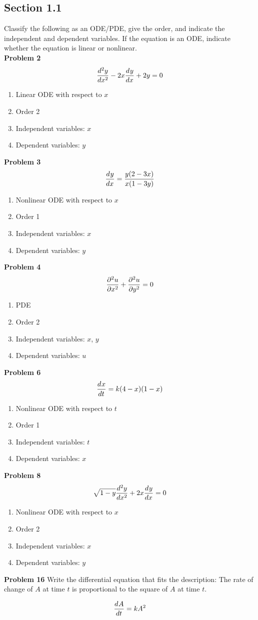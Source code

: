 \subsection*{Section 1.1}
Classify the following as an ODE/PDE, give the order,
and indicate the independent and dependent variables.
If the equation is an ODE, indicate whether the equation is linear or nonlinear.\\
\textbf{Problem 2}
\[
    \der[2]{y}{x} - 2x\der{y}{x} + 2y = 0
\]
\begin{enumerate}
    \item Linear ODE with respect to $x$
    \item Order 2
    \item Independent variables: $x$
    \item Dependent variables: $y$
\end{enumerate}
\textbf{Problem 3}
\[
    \der{y}{x} = \frac{y(2-3x)}{x(1-3y)}
\]
\begin{enumerate}
    \item Nonlinear ODE with respect to $x$
    \item Order 1
    \item Independent variables: $x$
    \item Dependent variables: $y$
\end{enumerate}
\textbf{Problem 4}
\[
    \pder[2]{u}{x} + \pder[2]{u}{y} = 0
\]
\begin{enumerate}
    \item PDE 
    \item Order 2
    \item Independent variables: $x$, $y$
    \item Dependent variables: $u$
\end{enumerate}
\textbf{Problem 6}
\[
    \der{x}{t} = k(4-x)(1-x)
\]
\begin{enumerate}
    \item Nonlinear ODE with respect to $t$
    \item Order 1
    \item Independent variables: $t$
    \item Dependent variables: $x$
\end{enumerate}
\textbf{Problem 8}
\[
    \sqrt{1-y}\der[2]{y}{x} + 2x\der{y}{x} = 0
\]
\begin{enumerate}
    \item Nonlinear ODE with respect to $x$
    \item Order 2
    \item Independent variables: $x$
    \item Dependent variables: $y$
\end{enumerate}
\textbf{Problem 16}
Write the differential equation that fits the description:
The rate of change of $A$ at time $t$ is proportional
to the square of $A$ at time $t$.

\solution
\[
    \der{A}{t} = kA^2
\]
\newpage